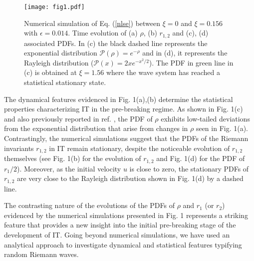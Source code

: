 \documentclass[twocolumn,preprintnumbers,amsmath,amssymb,superscriptaddress]{revtex4}
\begin{document}
\begin{figure}[h]
\texttt{[image: fig1.pdf]}
\caption{Numerical simulation of Eq. (\ref{nlse}) 
 between $\xi=0$ and  $\xi=0.156$ with $\epsilon=0.014$. 
Time evolution of (a) $\rho$, (b) $r_{1,2}$ 
and (c), (d) associated PDFs.  In (c) the black dashed line 
represents the exponential distribution $\mathcal{P}(\rho)=e^{-\rho}$ 
and in (d), it represents the Rayleigh distribution 
($\mathcal{P}(x)=2xe^{-x^2/2}$). The PDF in green line in (c) 
is obtained at $\xi=1.56$ where the wave system has reached 
a statistical stationary state.
}
\end{figure}


The dynamical features evidenced in Fig. 1(a),(b) determine
the statistical properties characterizing IT in the pre-breaking regime. As shown in Fig. 1(c) 
and also previously reported in ref. \cite{Randoux:14,Randoux:16b}, 
the PDF of $\rho$ exhibits low-tailed deviations from the exponential
distribution that arise from changes in $\rho$ seen
in Fig. 1(a).  Contrastingly, the numerical simulations suggest that the PDFs of the Riemann invariants $r_{1,2}$ in IT remain  stationary, despite the noticeable evolution of $r_{1,2}$ themselves (see Fig. 1(b) for the evolution of $r_{1,2}$  and Fig. 1(d) for the PDF of $r_1/2$).
Moreover,  as the initial velocity $u$ is close to zero, the stationary PDFs of $r_{1,2}$ are very close to the Rayleigh distribution shown in Fig. 1(d) by a dashed line. 


The contrasting nature of the evolutions of the PDFs of 
$\rho$ and $r_1$ (or $r_2$) evidenced by the numerical simulations 
presented in Fig. 1 represents a striking feature that 
provides a new insight into the initial pre-breaking stage of the development of 
IT. Going beyond numerical simulations, we have used an analytical 
approach to investigate dynamical and statistical features typifying
random Riemann waves. 
\end{document}
